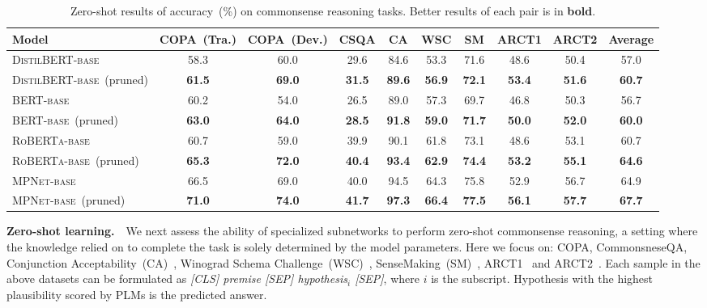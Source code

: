\begin{table}[t!]
	\centering
	\scriptsize
	\begin{tabular}{l|cccccccc|c}
		\toprule
		\textbf{Model} &\textbf{COPA~(Tra.)} &\textbf{COPA~(Dev.)} &\textbf{CSQA} &\textbf{CA} &\textbf{WSC}  &\textbf{SM} &\textbf{ARCT1} &\textbf{ARCT2} & \textbf{Average} \\
		\midrule
		\textsc{DistilBERT-base} &58.3 &60.0 &29.6 &84.6 &53.3  &71.6 &48.6 &50.4  &57.0  \\
		\textsc{DistilBERT-base}~(pruned) &\textbf{61.5} &\textbf{69.0} &\textbf{31.5} &\textbf{89.6} &\textbf{56.9}  &\textbf{72.1} &\textbf{53.4} &\textbf{51.6} & \textbf{60.7} \\
		\midrule
		\textsc{BERT-base} &60.2 &54.0 &26.5 &89.0 &57.3  &69.7 &46.8 &50.3 &56.7 \\
		\textsc{BERT-base}~(pruned) &\textbf{63.0} &\textbf{64.0} &\textbf{28.5} &\textbf{91.8} &\textbf{59.0}  &\textbf{71.7} &\textbf{50.0} &\textbf{52.0}  & \textbf{60.0}\\
		\midrule
		\textsc{RoBERTa-base} &60.7 &59.0 &39.9 &90.1 &61.8  &73.1 &48.6 &53.1 &60.7 \\
		\textsc{RoBERTa-base}~(pruned) &\textbf{65.3} &\textbf{72.0} &\textbf{40.4} &\textbf{93.4} &\textbf{62.9}  &\textbf{74.4} &\textbf{53.2} &\textbf{55.1} &\textbf{64.6}\\
		\midrule
		\textsc{MPNet-base} &66.5 &69.0 &40.0 &94.5 &64.3&75.8  &52.9 &56.7 &64.9  \\
		\textsc{MPNet-base}~(pruned) &\textbf{71.0} &\textbf{74.0} &\textbf{41.7} &\textbf{97.3} &\textbf{66.4}  &\textbf{77.5} &\textbf{56.1} &\textbf{57.7}  & \textbf{67.7}\\
		\bottomrule
	\end{tabular}
	\caption{Zero-shot results of accuracy~(\%) on commonsense reasoning tasks. Better results of each pair is in \textbf{bold}.}
	\label{table:zeroshot}
\end{table}



\textbf{Zero-shot learning.}~~We next assess the ability of specialized 
subnetworks to perform zero-shot commonsense reasoning, a setting where 
the knowledge relied on to complete the task is solely determined by the model 
parameters. Here we focus on: COPA, CommonsneseQA, Conjunction 
Acceptability~(CA)~\citep{Zhou2019}, 
Winograd Schema Challenge~(WSC)~\citep{levesque_winograd_2012}, 
SenseMaking~(SM)~\citep{wang-etal-2019-make}, 
ARCT1~\citep{habernal-etal-2018-argument} and 
ARCT2~\citep{DBLP:journals/corr/abs-1907-07355}. Each sample in the above datasets can be formulated as \textit{[CLS] premise [SEP] hypothesis$_i$ [SEP]}, where $i$ is the subscript. Hypothesis with the highest plausibility scored by PLMs is the predicted answer. 

